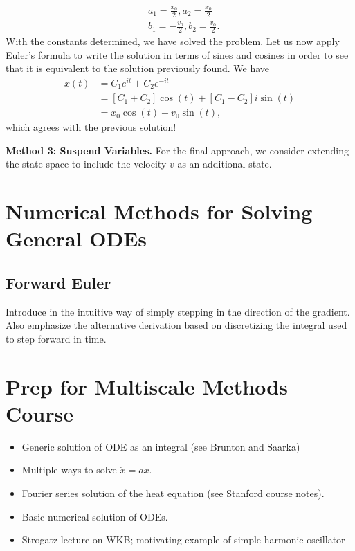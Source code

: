 \documentclass[12pt]{article}
\newcommand{\state}{x}
\begin{document}
\begin{align*}
&a_1 = \frac{x_0}{2}, a_2 = \frac{x_0}{2} \\
&b_1 = -\frac{v_0}{2}, b_2 = \frac{v_0}{2}.
\end{align*}
With the constants determined, we have solved the problem. Let us now apply Euler's formula to write the solution in terms of sines and cosines in order to see that it 
is equivalent to the solution previously found. We have 
\begin{align*}
\state(t) &= C_1 e^{it} + C_2 e^{-it} \\
	    &= \left[C_1 + C_2\right] \cos(t) + \left[ C_1 - C_2\right]i \sin(t) \\
	    &= \state_0 \cos(t) + v_0 \sin(t),
\end{align*}
which agrees with the previous solution! 

\bigskip
\noindent
\textbf{Method 3: Suspend Variables.} For the final approach, we consider extending the state space to include the velocity $v$ as an additional state. 




\section{Numerical Methods for Solving General ODEs}

\subsection{Forward Euler}
Introduce in the intuitive way of simply stepping in the direction of the gradient. Also emphasize the alternative derivation based on discretizing the integral used to 
step forward in time. 

\section{Prep for Multiscale Methods Course}
\begin{itemize}
\item Generic solution of ODE as an integral (see Brunton and Saarka)
\item Multiple ways to solve $\dot{x} = ax$. 
\item Fourier series solution of the heat equation (see Stanford course notes). 
\item Basic numerical solution of ODEs. 
\item Strogatz lecture on WKB; motivating example of simple harmonic oscillator
\end{itemize}
\end{document}
